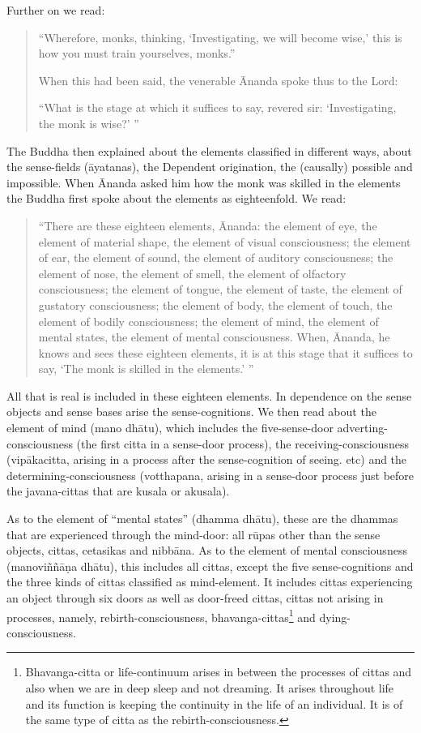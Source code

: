 Further on we read:
\begin{quote}

``Wherefore, monks, thinking, `Investigating, we will become wise,' this is how you must train yourselves, monks.''

When this had been said, the venerable Ānanda spoke thus to the Lord:

 ``What is the stage at which it suffices to say, revered sir: `Investigating, the monk is wise?' ''
\end{quote}

The Buddha then explained about the elements classified in different ways, about the sense-fields (āyatanas), the Dependent origination, the (causally) possible and impossible. When Ānanda asked him how the monk was skilled in the elements the Buddha first spoke about the elements as eighteenfold. We read:

\begin{quote}
``There are these eighteen elements, Ānanda: the element of eye, the element of material shape, the element of visual consciousness; the element of ear, the element of sound, the element of auditory consciousness; the element of nose, the element of smell, the element of olfactory consciousness; the element of tongue, the element of taste, the element of gustatory consciousness; the element of body, the element of touch, the element of bodily consciousness; the element of mind, the element of mental states, the element of mental consciousness. When, Ānanda, he knows and sees these eighteen elements, it is at this stage that it suffices to say, `The monk is skilled in the elements.' ''
\end{quote}

All that is real is included in these eighteen elements. In dependence on the sense objects and sense bases arise the sense-cognitions. We then read about the element of mind (mano dhātu), which includes the five-sense-door adverting-consciousness (the first citta in a sense-door process), the receiving-consciousness (vipākacitta, arising in a process after the sense-cognition of seeing. etc) and the determining-consciousness (votthapana, arising in a sense-door process just before the javana-cittas that are kusala or akusala).

As to the element of ``mental states'' (dhamma dhātu), these are the dhammas that are experienced through the mind-door: all rūpas other than the sense objects, cittas, cetasikas and nibbāna. As to the element of mental consciousness (manoviññāṇa dhātu), this includes all cittas, except the five sense-cognitions and the three kinds of cittas classified as mind-element. It includes cittas experiencing an object through six doors as well as door-freed cittas, cittas not arising in processes, namely, rebirth-consciousness, bhavanga-cittas\footnote{Bhavanga-citta or life-continuum arises in between the processes of cittas and also when we are in deep sleep and not dreaming. It arises throughout life and its function is keeping the continuity in the life of an individual. It is of the same type of citta as the rebirth-consciousness.} and dying-consciousness.

